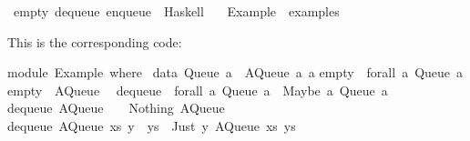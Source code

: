 \begin{isabellebody}
%
\endisadelimquote
%
\isatagquote
{}\isamarkupfalse%
\ empty\ dequeue\ enqueue\ \ Haskell\isanewline
\ \ \ Example\ \ {}examples{}{}%
\endisatagquote
{\isafoldquote}%
%
\isadelimquote
%
\endisadelimquote
%
\begin{isamarkuptext}%
\noindent This is the corresponding code:%
\end{isamarkuptext}%
\isamarkuptrue%
%
\isadelimquotetypewriter
%
\endisadelimquotetypewriter
%
\isatagquotetypewriter
%
\begin{isamarkuptext}%
module\ Example\ where\ {}\isanewline
\isanewline
data\ Queue\ a\ {}\ AQueue\ {}a{}\ {}a{}{}\isanewline
\isanewline
empty\ {}{}\ forall\ a{}\ Queue\ a{}\isanewline
empty\ {}\ AQueue\ {}{}\ {}{}{}\isanewline
\isanewline
dequeue\ {}{}\ forall\ a{}\ Queue\ a\ {}{}\ {}Maybe\ a{}\ Queue\ a{}{}\isanewline
dequeue\ {}AQueue\ {}{}\ {}{}{}\ {}\ {}Nothing{}\ AQueue\ {}{}\ {}{}{}{}\isanewline
dequeue\ {}AQueue\ xs\ {}y\ {}\ ys{}{}\ {}\ {}Just\ y{}\ AQueue\ xs\ ys{}{}\isanewline

\end{isamarkuptext}
\end{isabellebody}

